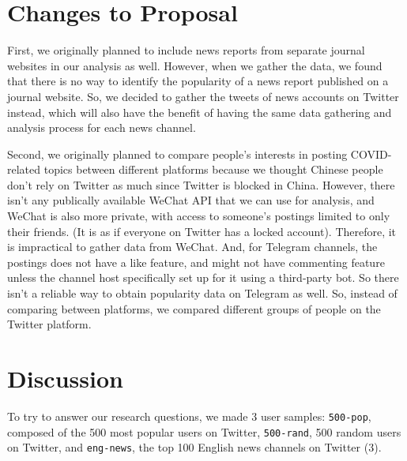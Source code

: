 \documentclass{article}
\begin{document}
    \section{Changes to Proposal}
    \indent

    First, we originally planned to include news reports from separate journal websites in our analysis as well. However, when we gather the data, we found that there is no way to identify the popularity of a news report published on a journal website. So, we decided to gather the tweets of news accounts on Twitter instead, which will also have the benefit of having the same data gathering and analysis process for each news channel.

    Second, we originally planned to compare people's interests in posting COVID-related topics between different platforms because we thought Chinese people don't rely on Twitter as much since Twitter is blocked in China. However, there isn't any publically available WeChat API that we can use for analysis, and WeChat is also more private, with access to someone's postings limited to only their friends. (It is as if everyone on Twitter has a locked account). Therefore, it is impractical to gather data from WeChat. And, for Telegram channels, the postings does not have a like feature, and might not have commenting feature unless the channel host specifically set up for it using a third-party bot. So there isn't a reliable way to obtain popularity data on Telegram as well. So, instead of comparing between platforms, we compared different groups of people on the Twitter platform.

    \section{Discussion}
    \indent

    To try to answer our research questions, we made 3 user samples: \texttt{500-pop}, composed of the 500 most popular users on Twitter, \texttt{500-rand}, 500 random users on Twitter, and \texttt{eng-news}, the top 100 English news channels on Twitter (3).
\end{document}
